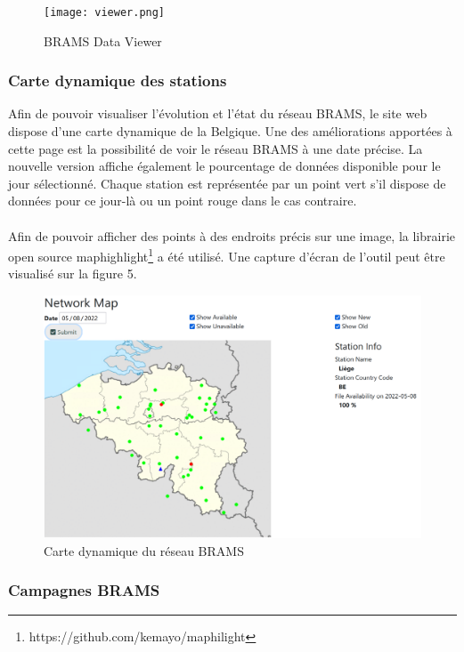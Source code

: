 \documentclass[11pt]{article}
\begin{document}
\begin{figure}[t]
    \begin{center}
        \texttt{[image: viewer.png]}
        \caption{BRAMS Data Viewer}
    \end{center}
\end{figure}

\subsubsection{Carte dynamique des stations}

Afin de pouvoir visualiser l'évolution et l'état du réseau BRAMS, le site web dispose d'une carte dynamique de la Belgique.
Une des améliorations apportées à cette page est la possibilité de voir le réseau BRAMS à une date précise.
La nouvelle version affiche également le pourcentage de données disponible pour le jour sélectionné.
Chaque station est représentée par un point vert s'il dispose de données pour ce jour-là ou un point rouge dans le cas contraire.\\
\\
Afin de pouvoir afficher des points à des endroits précis sur une image, la librairie open source maphighlight\footnote{https://github.com/kemayo/maphilight} a été utilisé.
Une capture d'écran de l'outil peut être visualisé sur la figure 5.

\begin{figure}[t]
    \begin{center}
        \includegraphics[scale=0.25]{map.png}
        \caption{Carte dynamique du réseau BRAMS}
    \end{center}
\end{figure}

\subsubsection{Campagnes BRAMS}
\end{document}
